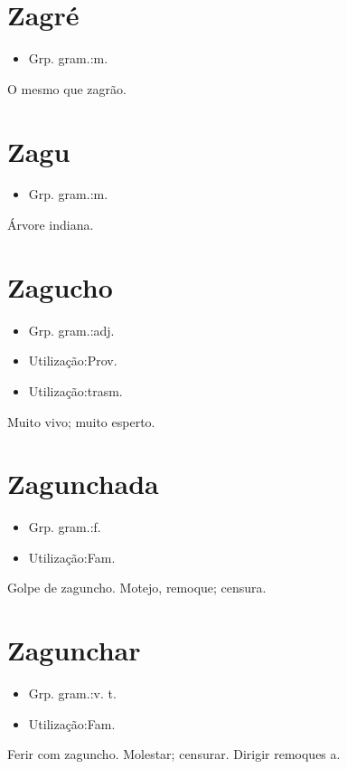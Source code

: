 \section{Zagré}
\begin{itemize}
\item {Grp. gram.:m.}
\end{itemize}
O mesmo que \textunderscore zagrão\textunderscore .
\section{Zagu}
\begin{itemize}
\item {Grp. gram.:m.}
\end{itemize}
Árvore indiana.
\section{Zagucho}
\begin{itemize}
\item {Grp. gram.:adj.}
\end{itemize}
\begin{itemize}
\item {Utilização:Prov.}
\end{itemize}
\begin{itemize}
\item {Utilização:trasm.}
\end{itemize}
Muito vivo; muito esperto.
\section{Zagunchada}
\begin{itemize}
\item {Grp. gram.:f.}
\end{itemize}
\begin{itemize}
\item {Utilização:Fam.}
\end{itemize}
Golpe de zaguncho.
Motejo, remoque; censura.
\section{Zagunchar}
\begin{itemize}
\item {Grp. gram.:v. t.}
\end{itemize}
\begin{itemize}
\item {Utilização:Fam.}
\end{itemize}
Ferir com zaguncho.
Molestar; censurar.
Dirigir remoques a.
